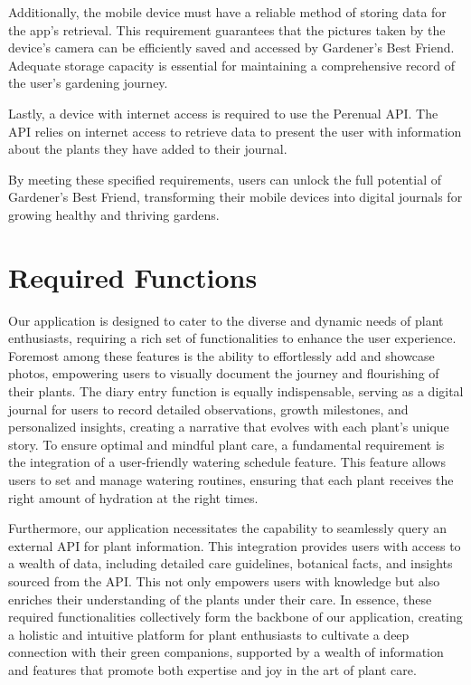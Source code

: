 \documentclass{sigchi}
\begin{document}
Additionally, the mobile device must have a reliable method of storing data for the app's retrieval. This requirement guarantees that the pictures taken by the device's camera can be efficiently saved and accessed by Gardener's Best Friend. Adequate storage capacity is essential for maintaining a comprehensive record of the user's gardening journey.

Lastly, a device with internet access is required to use the Perenual API. The API relies on internet access to retrieve data to present the user with information about the plants they have added to their journal.

By meeting these specified requirements, users can unlock the full potential of Gardener's Best Friend, transforming their mobile devices into digital journals for growing healthy and thriving gardens.

\section{Required Functions}

Our application is designed to cater to the diverse and dynamic needs of plant enthusiasts, requiring a rich set of functionalities to enhance the user experience. Foremost among these features is the ability to effortlessly add and showcase photos, empowering users to visually document the journey and flourishing of their plants. The diary entry function is equally indispensable, serving as a digital journal for users to record detailed observations, growth milestones, and personalized insights, creating a narrative that evolves with each plant's unique story. To ensure optimal and mindful plant care, a fundamental requirement is the integration of a user-friendly watering schedule feature. This feature allows users to set and manage watering routines, ensuring that each plant receives the right amount of hydration at the right times.

Furthermore, our application necessitates the capability to seamlessly query an external API for plant information. This integration provides users with access to a wealth of data, including detailed care guidelines, botanical facts, and insights sourced from the API. This not only empowers users with knowledge but also enriches their understanding of the plants under their care. In essence, these required functionalities collectively form the backbone of our application, creating a holistic and intuitive platform for plant enthusiasts to cultivate a deep connection with their green companions, supported by a wealth of information and features that promote both expertise and joy in the art of plant care.
\end{document}
